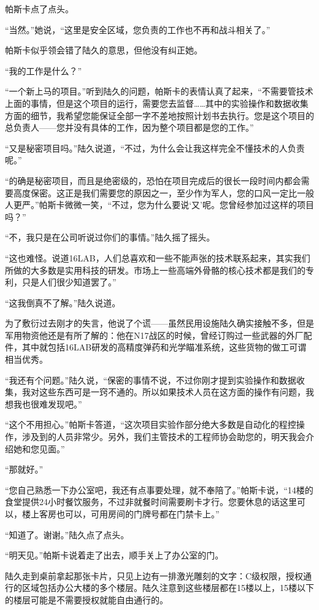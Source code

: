 帕斯卡点了点头。

“当然。”她说，“这里是安全区域，您负责的工作也不再和战斗相关了。”

帕斯卡似乎领会错了陆久的意思，但他没有纠正她。

“我的工作是什么？”

“一个新上马的项目。”听到陆久的问题，帕斯卡的表情认真了起来，“不需要管技术上面的事情，但是这个项目的运行，需要您去监督……其中的实验操作和数据收集方面的细节，我希望您能保证全部一字不差地按照计划书去执行。您是这个项目的总负责人——您并没有具体的工作，因为整个项目都是您的工作。”

“又是秘密项目吗。”陆久说道，“不过，为什么会让我这样完全不懂技术的人负责呢。”

“的确是秘密项目，而且是绝密级的，恐怕在项目完成后的很长一段时间内都会需要高度保密。这正是我们需要您的原因之一，至少作为军人，您的口风一定比一般人更严。”帕斯卡微微一笑，“不过，您为什么要说‘又’呢。您曾经参加过这样的项目吗？”

“不，我只是在公司听说过你们的事情。”陆久摇了摇头。

“这也难怪。说道16LAB，人们总喜欢和一些不能声张的技术联系起来，其实我们所做的大多数是实用科技的研发。市场上一些高端外骨骼的核心技术都是我们的专利，只是人们很少知道罢了。”

“这我倒真不了解。”陆久说道。

为了敷衍过去刚才的失言，他说了个谎——虽然民用设施陆久确实接触不多，但是军用物资他还是有所了解的：他在N17战区的时候，曾经订购过一些武器的外厂配件，其中就包括16LAB研发的高精度弹药和光学瞄准系统，这些货物的做工可谓相当优秀。

“我还有个问题。”陆久说，“保密的事情不说，不过你刚才提到实验操作和数据收集，我对这些东西可是一窍不通的。所以如果技术人员在这方面的操作有问题，我想我也很难发现吧。”

“这个不用担心。”帕斯卡答道，“这次项目实验作部分绝大多数是自动化的程控操作，涉及到的人员非常少。另外，我们主管技术的工程师协会助您的，明天我会介绍她和您见面。”

“那就好。”

“您自己熟悉一下办公室吧，我还有点事要处理，就不奉陪了。”帕斯卡说，“14楼的食堂提供24小时餐饮服务，不过非就餐时间需要刷卡才行。您要休息的话这里可以，楼上客房也可以，可用房间的门牌号都在门禁卡上。”

“知道了。谢谢。”陆久点了点头。

“明天见。”帕斯卡说着走了出去，顺手关上了办公室的门。

陆久走到桌前拿起那张卡片，只见上边有一排激光雕刻的文字：C级权限，授权通行的区域包括办公大楼的多个楼层。陆久注意到这些楼层都在15楼以上，15楼以下的楼层可能是不需要授权就能自由通行的。

